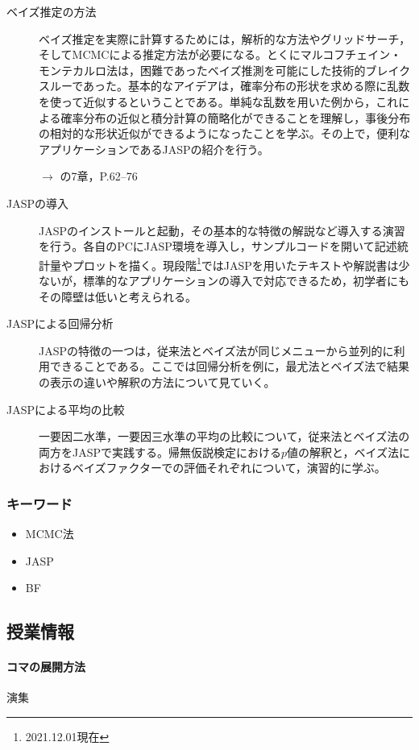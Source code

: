 \begin{description}
	\item[ベイズ推定の方法] ベイズ推定を実際に計算するためには，解析的な方法やグリッドサーチ，そしてMCMCによる推定方法が必要になる。とくにマルコフチェイン・モンテカルロ法は，困難であったベイズ推測を可能にした技術的ブレイクスルーであった。基本的なアイデアは，確率分布の形状を求める際に乱数を使って近似するということである。単純な乱数を用いた例から，これによる確率分布の近似と積分計算の簡略化ができることを理解し，事後分布の相対的な形状近似ができるようになったことを学ぶ。その上で，便利なアプリケーションであるJASPの紹介を行う。
	      \begin{flushright}
		      $\to$ \textcite{Maeda2017}の7章，\textcite{Baba201907}P.62--76
	      \end{flushright}
	\item[JASPの導入] JASPのインストールと起動，その基本的な特徴の解説など導入する演習を行う。各自のPCにJASP環境を導入し，サンプルコードを開いて記述統計量やプロットを描く。現段階\footnote{2021.12.01現在}ではJASPを用いたテキストや解説書は少ないが，標準的なアプリケーションの導入で対応できるため，初学者にもその障壁は低いと考えられる。
	\item[JASPによる回帰分析] JASPの特徴の一つは，従来法とベイズ法が同じメニューから並列的に利用できることである。ここでは回帰分析を例に，最尤法とベイズ法で結果の表示の違いや解釈の方法について見ていく。
	\item[JASPによる平均の比較] 一要因二水準，一要因三水準の平均の比較について，従来法とベイズ法の両方をJASPで実践する。帰無仮説検定における$p$値の解釈と，ベイズ法におけるベイズファクターでの評価それぞれについて，演習的に学ぶ。

\end{description}
\subsubsection{キーワード}
\begin{itemize}
	\item MCMC法
	\item JASP
	\item BF
\end{itemize}
\subsection{授業情報}
\paragraph{コマの展開方法}
演集
